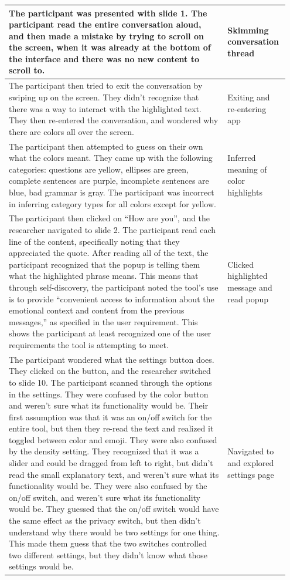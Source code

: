 \documentclass[acmsmall,screen,authorversion,nonacm]{acmart}
\begin{document}
\begin{center}
\begin{longtable}{|p{0.75\linewidth}|p{0.2\linewidth}|}
    \hline
    The participant was presented with slide 1. The participant read the entire conversation aloud, and then made a mistake by trying to scroll on the screen, when it was already at the bottom of the interface and there was no new content to scroll to. & Skimming conversation thread \\ \hline
    The participant then tried to exit the conversation by swiping up on the screen. They didn’t recognize that there was a way to interact with the highlighted text. They then re-entered the conversation, and wondered why there are colors all over the screen. & Exiting and re-entering app \\ \hline
    The participant then attempted to guess on their own what the colors meant. They came up with the following categories: questions are yellow, ellipses are green, complete sentences are purple, incomplete sentences are blue, bad grammar is gray. The participant was incorrect in inferring category types for all colors except for yellow. & Inferred meaning of color highlights \\ \hline
    The participant then clicked on “How are you”, and the researcher navigated to slide 2. The participant read each line of the content, specifically noting that they appreciated the quote. After reading all of the text, the participant recognized that the popup is telling them what the highlighted phrase means. This means that through self-discovery, the participant noted the tool’s use is to provide “convenient access to information about the emotional context and content from the previous messages,” as specified in the user requirement. This shows the participant at least recognized one of the user requirements the tool is attempting to meet. & Clicked highlighted message and read popup \\ \hline
    The participant wondered what the settings button does. They clicked on the button, and the researcher switched to slide 10. The participant scanned through the options in the settings. They were confused by the color button and weren’t sure what its functionality would be. Their first assumption was that it was an on/off switch for the entire tool, but then they re-read the text and realized it toggled between color and emoji. They were also confused by the density setting. They recognized that it was a slider and could be dragged from left to right, but didn’t read the small explanatory text, and weren’t sure what its functionality would be. They were also confused by the on/off switch, and weren’t sure what its functionality would be. They guessed that the on/off switch would have the same effect as the privacy switch, but then didn’t understand why there would be two settings for one thing. This made them guess that the two switches controlled two different settings, but they didn’t know what those settings would be. & Navigated to and explored settings page \\ \hline

\end{longtable}
\end{center}
\end{document}
